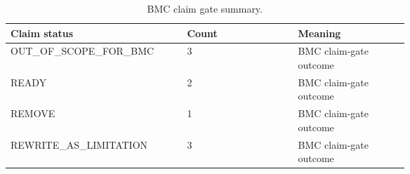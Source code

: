 \begin{table}[t]
\caption{BMC claim gate summary.}
\label{tab:claim-gate}
\small
\begin{tabular}{|p{0.22\linewidth}|p{0.22\linewidth}|p{0.22\linewidth}|}
\hline
Claim status & Count & Meaning \\
\hline
OUT\_OF\_SCOPE\_FOR\_BMC & 3 & BMC claim-gate outcome \\
READY & 2 & BMC claim-gate outcome \\
REMOVE & 1 & BMC claim-gate outcome \\
REWRITE\_AS\_LIMITATION & 3 & BMC claim-gate outcome \\
\hline
\end{tabular}
\end{table}

